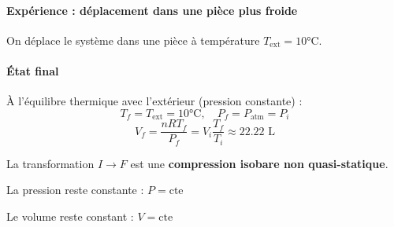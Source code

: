 \documentclass[french]{yLectureNote}
\begin{document}
\paragraph{Expérience : déplacement dans une pièce plus froide}
On déplace le système dans une pièce à température $T_{\mathrm{ext}} = 10°\text{C}$.

\paragraph{État final}
À l'équilibre thermique avec l'extérieur (pression constante) :
$$T_f = T_{\mathrm{ext}} = 10°\text{C}, \quad P_f = P_{\mathrm{atm}} = P_i$$
$$V_f = \frac{nRT_f}{P_f} = V_i \frac{T_f}{T_i} \approx 22.22\text{ L}$$

La transformation $I \to F$ est une \textbf{compression isobare non quasi-statique}.

\begin{definition}
    La pression reste constante : $P = \text{cte}$
\end{definition}

\begin{definition}
    Le volume reste constant : $V = \text{cte}$
\end{definition}
\end{document}
